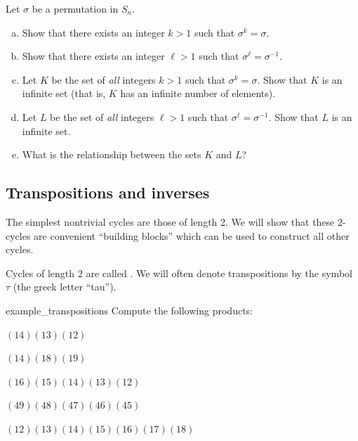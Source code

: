 \begin{exercise}{}
Let $\sigma$ be a permutation in $S_n$.  
\begin{enumerate}[(a)]
\item
Show that there exists an integer $k>1$ such that $\sigma^k = \sigma$.
\item
Show that there exists an integer $\ell>1$ such that $\sigma^{\ell} = \sigma^{-1}$.
\item
Let $K$ be the set of \emph{all} integers $k>1$ such that $\sigma^k = \sigma$. Show that $K$ is an infinite set (that is, $K$ has an infinite number of elements).
\item
Let $L$ be the set of \emph{all} integers $\ell>1$ such that $\sigma^{\ell} = \sigma^{-1}$. Show that $L$ is an infinite set.
\item
What is the relationship between the sets $K$ and $L$?
\end{enumerate}
\end{exercise}


\subsection{Transpositions and inverses}


The simplest  nontrivial cycles are those of length 2. We will show that these 2-cycles are convenient ``building blocks'' which can be used to construct all other cycles. 

\begin{defn} \label{Transposition}
Cycles of length 2 are called  .   We will often denote transpositions by the symbol $\tau$ (the greek letter ``tau'').
\end{defn}

\begin{exercise}{example_transpositions}
Compute the following products:
\begin{enumerate}[(a)]
\begin{multicols}{2}
\item
$(1 4)(1 3) (1 2)$
\item
$(1 4)(1 8) (1 9)$
\item
$(1 6)(1 5) (1 4)(1 3)(1 2)$
\item
$(4 9)(4 8) (4 7)(4 6)(4 5)$
\item
$(1 2)(1 3)(1 4)(1 5) (1 6)(1 7)(1 8)$

\end{multicols}
\end{enumerate}
\end{exercise}

